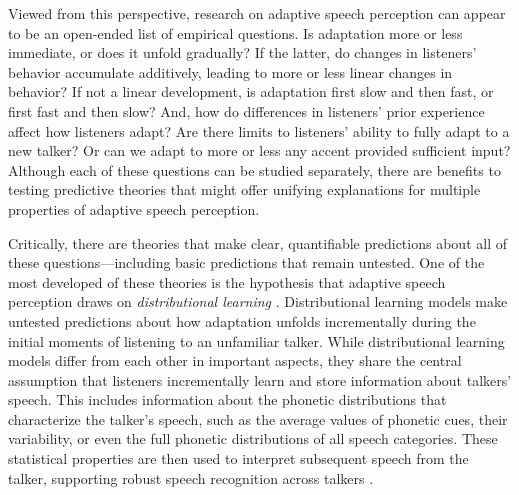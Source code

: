 \documentclass[
  11pt,
  man,mask,floatsintext]{apa6}
\begin{document}
Viewed from this perspective, research on adaptive speech perception can appear to be an open-ended list of empirical questions. Is adaptation more or less immediate, or does it unfold gradually? If the latter, do changes in listeners' behavior accumulate additively, leading to more or less linear changes in behavior? If not a linear development, is adaptation first slow and then fast, or first fast and then slow? And, how do differences in listeners' prior experience affect how listeners adapt? Are there limits to listeners' ability to fully adapt to a new talker? Or can we adapt to more or less any accent provided sufficient input? Although each of these questions can be studied separately, there are benefits to testing predictive theories that might offer unifying explanations for multiple properties of adaptive speech perception.

Critically, there are theories that make clear, quantifiable predictions about all of these questions---including basic predictions that remain untested. One of the most developed of these theories is the hypothesis that adaptive speech perception draws on \emph{distributional learning} \autocites[e.g.,][]{apfelbaum-mcmurray2015,harmon2019,johnson1997,kleinschmidt-jaeger2015,magnuson2020,nearey-assmann2007,lancia-winter2013,sohoglu-davis2016}. Distributional learning models make untested predictions about how adaptation unfolds incrementally during the initial moments of listening to an unfamiliar talker. While distributional learning models differ from each other in important aspects, they share the central assumption that listeners incrementally learn and store information about talkers' speech. This includes information about the phonetic distributions that characterize the talker's speech, such as the average values of phonetic cues, their variability, or even the full phonetic distributions of all speech categories. These statistical properties are then used to interpret subsequent speech from the talker, supporting robust speech recognition across talkers \autocites[for reviews, see][]{bent-baeseberk2021,schertz-clare2020,xie2023}.
\end{document}

